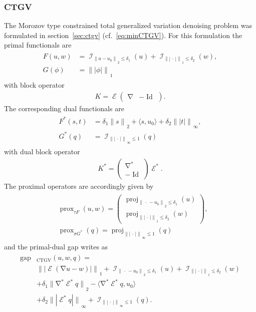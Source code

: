 \documentclass[twocolumn,envcountsame]{svjour3}
\newcommand{\norm}[2][]{{\|{#2}\|_{}}_{#1}}
\newcommand{\abs}[1]{|#1|}
\newcommand{\scp}[2]{\langle #1,#2\rangle}
\newcommand{\dummy}{\,\cdot\,}
\newcommand{\pmat}[1]{\begin{pmatrix} #1 \end{pmatrix}}
\DeclareMathOperator{\id}{Id}
\DeclareMathOperator{\ind}{\mathcal{I}}
\DeclareMathOperator{\prox}{prox}
\DeclareMathOperator{\proj}{proj}
\DeclareMathOperator{\gap}{gap}
\DeclareMathOperator{\grad}{\nabla}
\DeclareMathOperator{\symgrad}{\mathcal{E}}
\begin{document}
\subsubsection{CTGV}
\label{sec:dualctgv}
%
The Morozov type constrained total generalized variation denoising 
problem was formulated in section~\ref{sec:ctgv} 
(cf.~\eqref{eq:minCTGV}). For this formulation the primal functionals
are
\begin{align}\label{eq:primalmctgv}
\begin{split}
	F(u,w) &= \ind_{\norm[2]{u - u_0}\leq \delta_1}(u) + 
		\ind_{\norm[1]{\abs{\dummy}}\leq \delta_2}(w),\\
	G(\phi) &= \norm[1]{\abs{\phi}}
\end{split}
\end{align}
with block operator 
\begin{align}\label{eq:operatormctgv}
	K = \symgrad\pmat{\grad & -\id}.
\end{align}
The corresponding dual functionals are
\begin{align}\label{eq:dualctgv}
\begin{split}
	F^*(s,t) &= \delta_1\norm[2]{s} + \scp{s}{u_0}
			+ \delta_2\norm[\infty]{\abs{t}},\\
	G^*(q) &= \ind_{\norm[\infty]{\abs{\dummy}}\leq 1}(q)
\end{split}
\end{align}
with dual block operator
\begin{align}\label{eq:dualoperatormctgv}
	K^* = \pmat{\grad^* \\ -\id}\symgrad^*.
\end{align}
%
The proximal operators are accordingly given by
\begin{align}\label{eq:proxmctgv}
\begin{split}
	&\prox_{\tau F}(u,w) 
	= \pmat{
		\proj_{\norm[2]{\dummy - u_0}\leq \delta_1}(u)\\
		\proj_{\norm[1]{\abs{\dummy}}\leq \delta_2}(w)
		},\\
	&\prox_{\sigma G^*}(q) 
	= \proj_{\norm[\infty]{\abs{\dummy}}\leq 1}(q)
\end{split}
\end{align}
and the primal-dual gap writes as
\begin{align}\label{eq:pdgapmctgv}
\begin{split}
	\gap&_{\operatorname{CTGV}}(u,w,q)=\\
   	&\norm[1]{\abs{\symgrad(\grad u - w)}} 
			+\ind_{\norm[2]{\dummy -u_0}\leq \delta_1}(u)
			+\ind_{\norm[1]{\abs{\dummy}}\leq \delta_2}(w)\\
			&+\delta_1\norm[2]{\grad^*\symgrad^*q} 
			- \scp{\grad^*\symgrad^*q}{u_0}\\
			&+\delta_2 \norm[\infty]{\abs{\symgrad^*q}} + 
			\ind_{\norm[\infty]{\abs{\dummy}}\leq 1}(q).
\end{split}
\end{align}
\end{document}
